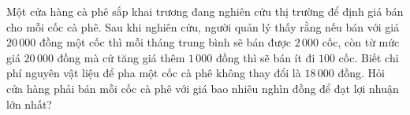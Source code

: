 \begin{bt}%
	Một cửa hàng cà phê sắp khai trương đang nghiên cứu thị trường để định giá bán cho mỗi cốc cà phê. Sau khi nghiên cứu, người quản lý thấy rằng nếu bán với giá $20\, 000$ đồng một cốc thì mỗi tháng trung bình sẽ bán được $2\, 000$ cốc,  còn từ mức giá $20\, 000$ đồng mà cứ tăng giá thêm $1\, 000$ đồng thì sẽ bán ít đi $100$ cốc. Biết chi phí nguyên vật liệu để pha một cốc cà phê không thay đổi là $18\, 000$ đồng. Hỏi cửa hàng phải bán mỗi cốc cà phê với giá bao nhiêu nghìn đồng để đạt lợi nhuận lớn nhất?
\end{bt}

